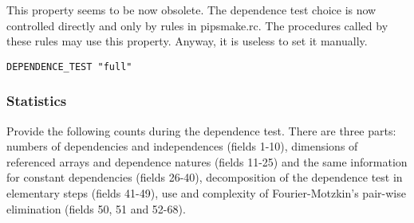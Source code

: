 This property seems to be now obsolete. The dependence test choice is
now controlled directly and only by rules in pipsmake.rc. The procedures
called by these rules may use this property. Anyway, it is useless to
set it manually.

\begin{verbatim}
DEPENDENCE_TEST "full"
\end{verbatim}

\subsubsection{Statistics}

Provide the following counts during the dependence test. There are three
parts: numbers of dependencies and independences (fields 1-10),
dimensions of referenced arrays and dependence natures (fields 11-25)
and the same information for constant dependencies (fields 26-40),
decomposition of the dependence test in elementary steps (fields 41-49),
use and complexity of Fourier-Motzkin's pair-wise elimination (fields
50, 51 and 52-68).

